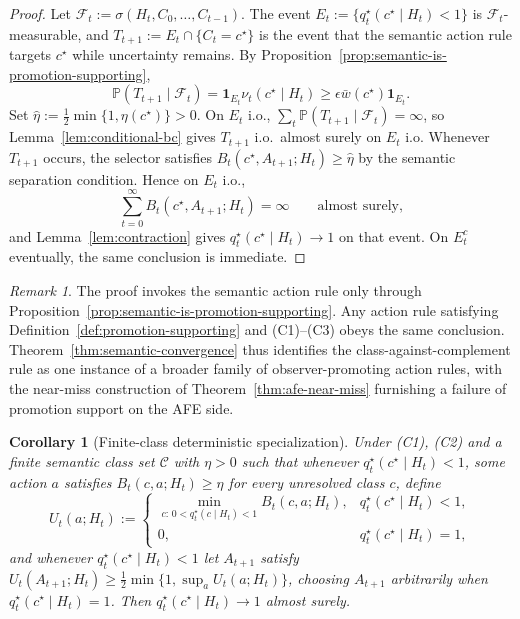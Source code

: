 \documentclass[11pt]{article}
\newtheorem{corollary}[theorem]{Corollary}
\theoremstyle{definition}
\theoremstyle{remark}
\newtheorem{remark}[theorem]{Remark}
\newcommand{\Ccal}{\mathcal{C}}
\newcommand{\Prob}{\mathbb{P}}
\newcommand{\one}{\mathbf{1}}
\begin{document}
\begin{proof}
Let $\mathcal{F}_t:=\sigma(H_t,C_0,\dots,C_{t-1})$. The event $E_t:=\{q_t^\star(c^\star\mid H_t)<1\}$ is $\mathcal{F}_t$-measurable, and $T_{t+1}:=E_t\cap\{C_t=c^\star\}$ is the event that the semantic action rule targets $c^\star$ while uncertainty remains. By Proposition~\ref{prop:semantic-is-promotion-supporting},
\[
\Prob(T_{t+1}\mid\mathcal{F}_t)
=\one_{E_t}\nu_t(c^\star\mid H_t)\ge\epsilon\bar w(c^\star)\one_{E_t}.
\]
Set $\hat\eta:=\tfrac{1}{2}\min\{1,\eta(c^\star)\}>0$. On $E_t$ i.o., $\sum_t\Prob(T_{t+1}\mid\mathcal{F}_t)=\infty$, so Lemma~\ref{lem:conditional-bc} gives $T_{t+1}$ i.o.\ almost surely on $E_t$ i.o. Whenever $T_{t+1}$ occurs, the selector satisfies $B_t(c^\star,A_{t+1};H_t)\ge\hat\eta$ by the semantic separation condition. Hence on $E_t$ i.o.,
\[
\sum_{t=0}^{\infty}B_t(c^\star,A_{t+1};H_t)=\infty
\qquad
\text{almost surely,}
\]
and Lemma~\ref{lem:contraction} gives $q_t^\star(c^\star\mid H_t)\to 1$ on that event. On $E_t^c$ eventually, the same conclusion is immediate.
\end{proof}

\begin{remark}
\label{rem:promotion-support}
The proof invokes the semantic action rule only through Proposition~\ref{prop:semantic-is-promotion-supporting}. Any action rule satisfying Definition~\ref{def:promotion-supporting} and (C1)--(C3) obeys the same conclusion. Theorem~\ref{thm:semantic-convergence} thus identifies the class-against-complement rule as one instance of a broader family of observer-promoting action rules, with the near-miss construction of Theorem~\ref{thm:afe-near-miss} furnishing a failure of promotion support on the AFE side.
\end{remark}

\begin{corollary}[Finite-class deterministic specialization]
\label{cor:finite-maximin}
Under (C1), (C2) and a finite semantic class set $\Ccal$ with $\eta>0$ such that whenever $q_t^\star(c^\star\mid H_t)<1$, some action $a$ satisfies $B_t(c,a;H_t)\ge\eta$ for every unresolved class $c$, define
\[
U_t(a;H_t):=
\begin{cases}
\min_{c:\,0<q_t^\star(c\mid H_t)<1}B_t(c,a;H_t), & q_t^\star(c^\star\mid H_t)<1,\\
0, & q_t^\star(c^\star\mid H_t)=1,
\end{cases}
\]
and whenever $q_t^\star(c^\star\mid H_t)<1$ let $A_{t+1}$ satisfy $U_t(A_{t+1};H_t)\ge\tfrac{1}{2}\min\{1,\sup_a U_t(a;H_t)\}$, choosing $A_{t+1}$ arbitrarily when $q_t^\star(c^\star\mid H_t)=1$. Then $q_t^\star(c^\star\mid H_t)\to 1$ almost surely.
\end{corollary}
\end{document}
